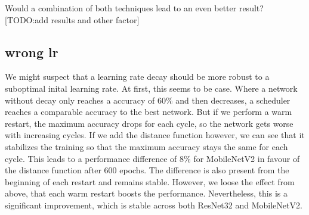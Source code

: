 Would a combination of both techniques lead to an even better result?
[TODO:add results and other factor] 







\subsection{wrong lr}

We might suspect that a learning rate decay should be more robust to a
suboptimal inital learning rate. At first, this seems to be case. Where a
network without decay only reaches a accuracy of 60\% and then decreases, a
scheduler reaches a comparable accuracy to the best network. But if we perform a
warm restart, the maximum accuracy drops for each cycle, so the network gets
worse with increasing cycles. If we add the distance function however, we can
see that it stabilizes the training so that the maximum accuracy stays the same
for each cycle. This leads to a performance difference of 8\% for MobileNetV2 in
favour of the distance function after 600 epochs. The difference is also present
from the beginning of each restart and remains stable. However, we loose the
effect from above, that each warm restart boosts the performance. Nevertheless,
this is a significant improvement, which is stable across both ResNet32 and
MobileNetV2.

